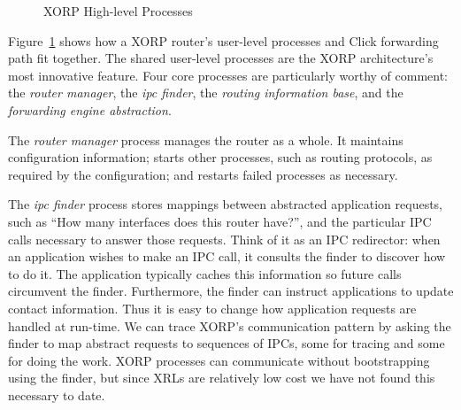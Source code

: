 
\begin{figure}[h]
\centerline{}
\caption{XORP High-level Processes}
\label{fig:processes}
\vspace{-0.1in}
\end{figure}

Figure~\ref{fig:processes} shows how a XORP router's user-level processes
and Click forwarding path fit together.
The shared user-level processes are the XORP architecture's most innovative
feature. Four core processes are particularly worthy of comment: the
\emph{router manager},
the \emph{ipc finder}, the \emph{routing information base}, and the 
\emph{forwarding engine abstraction}.  

The \emph{router manager}
process manages the router as a whole.  It maintains
configuration information; starts other processes, such as routing
protocols, as required by the configuration; and restarts failed
processes as necessary.

The \emph{ipc finder} process stores mappings between abstracted application
requests, such as ``How many interfaces does this router have?'', and the
particular IPC calls necessary to answer those requests.
Think of it as an IPC redirector:
when an application wishes to make an IPC
call, it consults the finder to discover how to do it.  The
application typically caches this information so future calls
circumvent the finder.  Furthermore, the finder can instruct
applications to update contact information.  Thus it is easy to change
how application requests are handled at run-time.  We
can trace XORP's communication pattern by asking the finder to map
abstract requests to sequences of IPCs, some for tracing and some for
doing the work.  XORP processes can communicate without
bootstrapping using the finder, but since XRLs are relatively low cost we
have not found this necessary to date.

